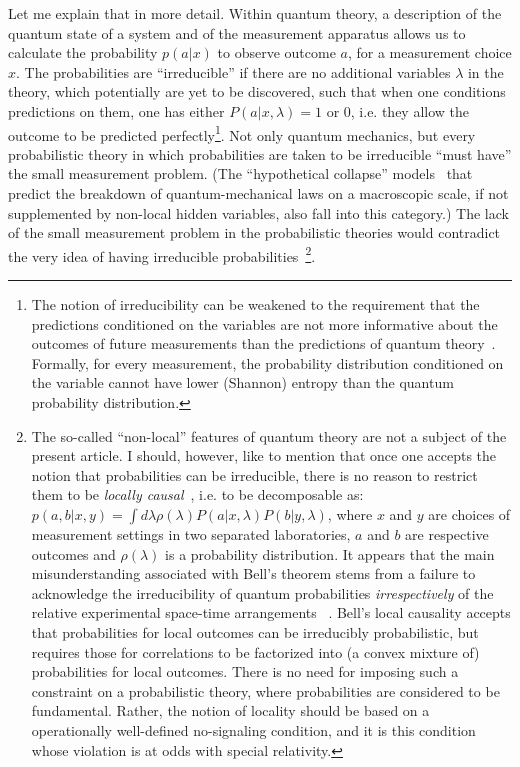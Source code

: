 \documentclass[12pt]{article}
\begin{document}
Let me explain that in more detail. Within quantum theory, a description of the quantum state of a system and of the measurement apparatus allows us to calculate the probability $p(a|x)$ to observe outcome $a$, for a measurement choice $x$. The probabilities are ``irreducible'' if there are no additional variables $\lambda$ in the theory, which potentially are yet to be discovered, such that when one conditions predictions on them, one has either $P(a|x,\lambda)=1$ or $0$, i.e. they allow the outcome to be predicted perfectly\footnote{The notion of irreducibility can be weakened to the requirement that the predictions conditioned on the variables are not more informative about the outcomes of future measurements than the predictions of quantum theory~\cite{colbeck}. Formally, for every measurement, the probability distribution conditioned on the variable cannot have lower (Shannon) entropy than the quantum probability distribution.}. Not only quantum mechanics, but every probabilistic theory in which probabilities are taken to be irreducible ``must have'' the small measurement problem. (The ``hypothetical collapse'' models~\cite{GRW,diosi,penrose} that predict the breakdown of quantum-mechanical laws on a macroscopic scale, if not supplemented by non-local hidden variables, also fall into this category.) The lack of the small measurement problem in the probabilistic theories would contradict the very idea of having irreducible probabilities~\footnote{The so-called ``non-local'' features of quantum theory are not a subject of the present article. I should, however, like to mention that once one accepts the notion that probabilities can be irreducible, there is no reason to restrict them to be {\it locally causal}~\cite{bell}, i.e. to be decomposable as: $p(a,b|x,y) = \int d\lambda \rho(\lambda) P(a|x,\lambda) P(b|y,\lambda)$, where $x$ and $y$ are choices of measurement settings in two separated laboratories, $a$ and $b$ are respective outcomes and $\rho(\lambda)$ is a probability distribution. It appears that the main misunderstanding associated with Bell's theorem stems from a failure to acknowledge the irreducibility of quantum probabilities {\em irrespectively} of the relative experimental space-time arrangements ~\cite{marek}. Bell's local causality accepts that probabilities for local outcomes can be irreducibly probabilistic, but requires those for correlations to be factorized into (a convex mixture of) probabilities for local outcomes. There is no need for imposing such a constraint on a probabilistic theory, where probabilities are considered to be fundamental. Rather, the notion of locality should be based on a operationally well-defined no-signaling condition, and it is this condition whose violation is at odds with special relativity.}.
\end{document}
